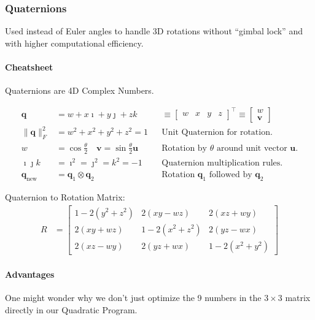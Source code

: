 \documentclass[11pt]{article}
\begin{document}
\subsubsection{Quaternions}
\label{sec:orgc29380d}
Used instead of Euler angles to handle 3D rotations
without ``gimbal lock'' and with higher computational
efficiency.
\paragraph*{Cheatsheet}
\label{sec:org62909e1}
Quaternions are 4D Complex Numbers.

\begin{align*}
  \mathbf{q}
  &= w + x\imath + y\jmath + zk
  &&\equiv \begin{bmatrix}
      w & x & y & z
  \end{bmatrix}^{\top} \equiv \begin{bmatrix}
      w \\ \mathbf{v}
  \end{bmatrix}
  \\
  \|\mathbf{q}\|_F^2
  &= w^2 + x^2 + y^2 + z^2 = 1
  && \text{Unit Quaternion for rotation.}
  \\
  w
  &= \cos\frac{\theta}{2} \quad
    \mathbf{v} = \sin\frac\theta2 \mathbf{u}
  && \text{Rotation by } \theta \text{ around unit
     vector } \mathbf{u}.
  \\
  \imath\jmath k
  &= \imath^2 = \jmath^2 = k^2 = -1
  && \text{Quaternion multiplication rules.}
  \\
  \mathbf{q}_{\text{new}}
  &= \mathbf{q}_1 \otimes \mathbf{q}_2
  && \text{Rotation } \mathbf{q}_1 \text{ followed by }
     \mathbf{q}_2
\end{align*}

Quaternion to Rotation Matrix:
\begin{align*}
  R
  &= \begin{bmatrix}
    1 - 2(y^2 + z^2) & 2(xy - wz) & 2(xz + wy) \\
    2(xy + wz) & 1 - 2(x^2 + z^2) & 2(yz - wx) \\
    2(xz - wy) & 2(yz + wx) & 1 - 2(x^2 + y^2)
  \end{bmatrix}
\end{align*}
\paragraph*{Advantages}
\label{sec:org91baea6}
One might wonder why we don't just optimize the 9
numbers in the \(3 \times 3\) matrix directly in our
Quadratic Program.
\end{document}
